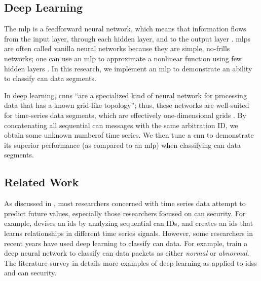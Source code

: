 \documentclass[../main.tex]{subfiles}
\begin{document}
\subsection{Deep Learning}\label{sec:background:dl}

The \acl{mlp} is a feedforward neural network, which means that information flows from the input layer, through each hidden layer, and to the output layer \cite{Goodfellow2016}. \acp{mlp} are often called vanilla neural networks because they are simple, no-frills networks; one can use an \ac{mlp} to approximate a nonlinear function using few hidden layers \cite{Burkov2019}. In this research, we implement an \ac{mlp} to demonstrate an ability to classify \ac{can} data segments.

In deep learning, \aclp{cnn} ``are a specialized kind of neural network for processing data that has a known grid-like topology''; thus, these networks are well-suited for time-series data segments, which are effectively one-dimensional grids \cite{Goodfellow2016, Box1994}. By concatenating all sequential \ac{can} messages with the same arbitration ID, we obtain some unknown number\footnotemark[1] of time series. We then tune a \ac{cnn} to demonstrate its superior performance (as compared to an \ac{mlp}) when classifying \ac{can} data segments.


\subsection{Related Work}\label{sec:background:related}


As discussed in \cite{Box1994}, most researchers concerned with time series data attempt to predict future values, especially those researchers focused on \ac{can} security. For example, \cite{Marchetti2017} devises an \ac{ids} by analyzing sequential \ac{can} IDs, and \cite{Tyree2018} creates an \ac{ids} that learns relationships in different time series signals. However, some researchers in recent years have used deep learning to classify \ac{can} data. For example, \cite{Kang2016} train a deep neural network to classify \ac{can} data packets as either \textit{normal} or \textit{abnormal}. The literature survey in \cite{Kwon2017} details more examples of deep learning as applied to \acp{ids} and \ac{can} security.
\end{document}
